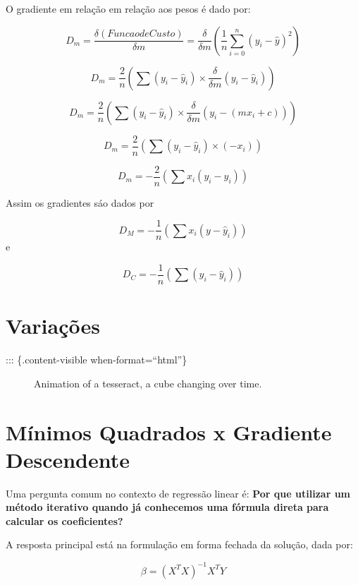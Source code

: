 \documentclass[
  letterpaper,
  DIV=11,
  numbers=noendperiod]{scrreprt}
\begin{document}
O gradiente em relação em relação aos pesos é dado por:

\[D_m = \frac{\delta(Funcao de Custo)}{\delta m } = \frac{\delta}{\delta m}(\frac{1}{n}\sum^n_{i=0}(y_i - \hat y)^2)\]

\[D_m = \frac{2}{n}(\sum (y_i- \hat y_i) \times \frac{\delta}{\delta m}(y_i-\hat y_i))\]

\[D_m = \frac{2}{n}(\sum (y_i- \hat y_i) \times \frac{\delta}{\delta m}(y_i - (mx_i + c)))\]

\[D_m = \frac{2}{n}(\sum (y_i- \hat y_i) \times(-x_i))\]

\[D_m = -\frac{2}{n}(\sum x_i(y_i- \hat y_i))\]

Assim os gradientes sáo dados por

\[D_M = -\frac{1}{n}(\sum x_i (y - \hat y_i))\] e

\[D_C = -\frac{1}{n}(\sum(y_i - \hat y_i))\]


\hypertarget{variauxe7uxf5es}{%
\chapter{Variações}\label{variauxe7uxf5es}}

::: \{.content-visible when-format=``html''\}

\begin{figure}

{\centering 

}

\caption{\label{fig-tesseract}Animation of a tesseract, a cube changing
over time.}

\end{figure}


\hypertarget{muxednimos-quadrados-x-gradiente-descendente}{%
\chapter{Mínimos Quadrados x Gradiente
Descendente}\label{muxednimos-quadrados-x-gradiente-descendente}}

Uma pergunta comum no contexto de regressão linear é: \textbf{Por que
utilizar um método iterativo quando já conhecemos uma fórmula direta
para calcular os coeficientes?}

A resposta principal está na formulação em forma fechada da solução,
dada por:

\[\beta = (X^TX)^{-1}X^TY\]
\end{document}
